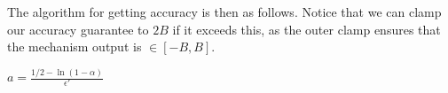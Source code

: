 \documentclass[11pt]{scrartcl} %
\begin{document}
The algorithm for getting accuracy is then as follows. Notice that we can clamp our accuracy guarantee to $2B$ if it
exceeds this, as the outer clamp ensures that the mechanism output is $\in [-B, B]$.
\begin{algorithm}
	\label{GetAccuracy2}
	\begin{algorithmic}
			\State $a = \frac{1/2 - \ln(1 - \alpha)}{\epsilon'}$
					\State{}
			\Else{}
				\State{}
			\EndIf
		\EndFunction
	\end{algorithmic}
\end{algorithm}

\end{document}

